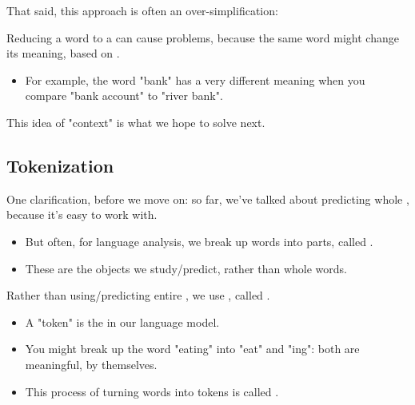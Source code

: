         That said, this approach is often an over-simplification:\\

        \begin{concept}
            Reducing a word to a  can cause problems, because the same word might change its meaning, based on .
        \end{concept}

        \begin{itemize}
            \item \miniex For example, the word "bank" has a very different meaning when you compare "bank account" to "river bank".
        \end{itemize}

        This idea of "context" is what we hope to solve next.

    \pagebreak



    \subsection{Tokenization}

        One clarification, before we move on: so far, we've talked about predicting whole , because it's easy to work with.

        \begin{itemize}
            \item But often, for language analysis, we break up words into parts, called .

            \item These are the objects we study/predict, rather than whole words.\\
        \end{itemize}

        \begin{definition}
            Rather than using/predicting entire , we use , called .

            \begin{itemize}
                \item A "token" is the  in our language model.
            \end{itemize}
        \end{definition}

        \begin{itemize}
            \item \miniex You might break up the word "eating" into "eat" and "ing": both are meaningful, by themselves.

            \item This process of turning words into tokens is called .
        \end{itemize}

